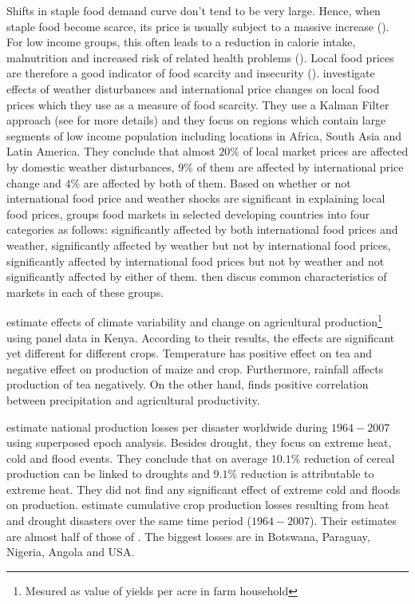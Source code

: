 \documentclass[a4paper,12pt]{article}
\begin{document}
Shifts in staple food demand curve don't tend to be very large. Hence, when staple food become scarce, its price is usually subject to a massive increase (\citealp{Brown2015, brown2014book}). For low income groups, this often leads to a reduction in calorie intake, malnutrition and increased risk of related health problems (\citealp{Golden2011, Handa2006}). Local food prices are therefore a good indicator of food scarcity and insecurity (\citealp{baffes2017, Brown2015}). \cite{Brown2015} investigate effects of weather disturbances and international price changes on local food prices which they use as a measure of food scarcity. They use a Kalman Filter approach (see \cite{KoopmanSJ} for more details) and they focus on regions which contain large segments of low income population including locations in Africa, South Asia and Latin America. They conclude that almost $20\%$ of local market prices are affected by domestic weather disturbances, $9\%$ of them are affected by international price change and $4\%$ are affected by both of them. Based on whether or not international food price and weather shocks are significant in explaining local food prices, \cite{brown2014book} groups food markets in selected developing countries into four categories as follows: significantly affected by both international food prices and weather, significantly affected by weather but not by international food prices, significantly affected by international food prices but not by weather and not significantly affected by either of them. \cite{brown2014book} then discus common characteristics of markets in each of these groups.

\cite{Ochieng2016} estimate effects of climate variability and change on agricultural production\footnote{Mesured as value of yields per acre in farm household} using panel data in Kenya. According to their results, the effects are significant yet different for different crops. Temperature has positive effect on tea and negative effect on production of maize and crop. Furthermore, rainfall affects production of tea negatively. On the other hand, \cite{Vrieling2011} finds positive correlation between precipitation and agricultural productivity.







\cite{Pedram2016} estimate national production losses per disaster worldwide during ${1964-2007}$ using superposed epoch analysis. Besides drought, they focus on extreme heat, cold and flood events. They conclude that on average $10.1\%$ reduction of cereal production can be linked to droughts and $9.1\%$ reduction is attributable to extreme heat. They did not find any significant effect of extreme cold and floods on production. \cite{Mehrabi2017} estimate cumulative crop production losses resulting from heat and drought disasters over the same time period (${1964-2007}$). Their estimates are almost half of those of \cite{Pedram2016}. The biggest losses are in Botswana, Paraguay, Nigeria, Angola and USA.
\end{document}
